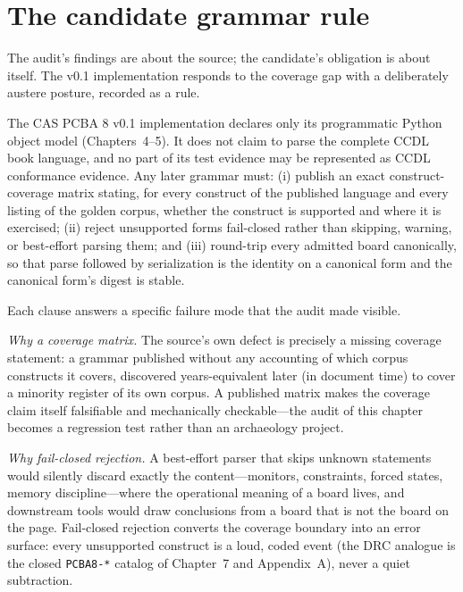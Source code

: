 \section{The candidate grammar rule}\label{ch10:candidate-rule}

The audit's findings are about the source; the candidate's obligation is about itself. The v0.1 implementation responds to the coverage gap with a deliberately austere posture, recorded as a rule.

\begin{ruleenv}\label{ch10:rule-candidate}
The CAS PCBA 8 v0.1 implementation declares only its programmatic Python object model (Chapters~4--5). It does not claim to parse the complete CCDL book language, and no part of its test evidence may be represented as CCDL conformance evidence. Any later grammar must: (i) publish an exact construct-coverage matrix stating, for every construct of the published language and every listing of the golden corpus, whether the construct is supported and where it is exercised; (ii) reject unsupported forms fail-closed rather than skipping, warning, or best-effort parsing them; and (iii) round-trip every admitted board canonically, so that parse followed by serialization is the identity on a canonical form and the canonical form's digest is stable.
\end{ruleenv}

Each clause answers a specific failure mode that the audit made visible.

\emph{Why a coverage matrix.} The source's own defect is precisely a missing coverage statement: a grammar published without any accounting of which corpus constructs it covers, discovered years-equivalent later (in document time) to cover a minority register of its own corpus. A published matrix makes the coverage claim itself falsifiable and mechanically checkable---the audit of this chapter becomes a regression test rather than an archaeology project.

\emph{Why fail-closed rejection.} A best-effort parser that skips unknown statements would silently discard exactly the content---monitors, constraints, forced states, memory discipline---where the operational meaning of a board lives, and downstream tools would draw conclusions from a board that is not the board on the page. Fail-closed rejection converts the coverage boundary into an error surface: every unsupported construct is a loud, coded event (the DRC analogue is the closed \texttt{PCBA8-*} catalog of Chapter~7 and Appendix~A), never a quiet subtraction.

